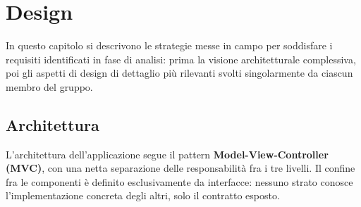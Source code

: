 \documentclass[11pt, a4paper, oneside]{report}
\begin{document}
\chapter{Design}
In questo capitolo si descrivono le strategie messe in campo per soddisfare i
requisiti identificati in fase di analisi: prima la visione architetturale
complessiva, poi gli aspetti di design di dettaglio pi\`u rilevanti svolti
singolarmente da ciascun membro del gruppo.

\section{Architettura}
L'architettura dell'applicazione segue il pattern
\textbf{Model-View-Controller (MVC)}, con una netta separazione delle
responsabilità fra i tre livelli. Il confine fra le componenti è definito
esclusivamente da interfacce: nessuno strato conosce l'implementazione
concreta degli altri, solo il contratto esposto.
\end{document}
